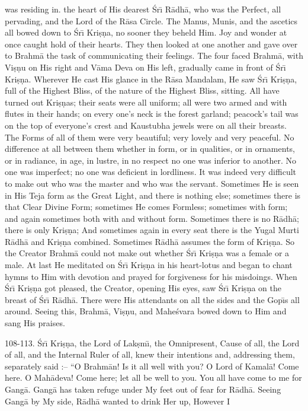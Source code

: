 was residing in. the heart of His dearest \'Sr\={\i} R\=adh\=a, who was the Perfect, all pervading, and the Lord of the R\=asa Circle. The Manus, Munis, and the ascetics all bowed down to \'Sr\={\i} Kri\d{s}\d{n}a, no sooner they beheld Him. Joy and wonder at once caught hold of their hearts. They then looked at one another and gave over to Brahm\=a the task of communicating their feelings. The four faced Brahm\=a, with Vi\d{s}\d{n}u on His right and V\=ama Deva on His left, gradually came in front of \'Sr\={\i} Kri\d{s}\d{n}a. Wherever He cast His glance in the R\=asa Mandalam, He saw \'Sr\={\i} Kri\d{s}\d{n}a, full of the Highest Bliss, of the nature of the Highest Bliss, sitting. All have turned out Kri\d{s}\d{n}as; their seats were all uniform; all were two armed and with flutes in their hands; on every one's neck is the forest garland; peacock's tail was on the top of everyone's crest and Kaustubha jewels were on all their breasts. The Forms of all of them were very beautiful; very lovely and very peaceful. No difference at all between them whether in form, or in qualities, or in ornaments, or in radiance, in age, in lustre, in no respect no one was inferior to another. No one was imperfect; no one was deficient in lordliness. It was indeed very difficult to make out who was the master and who was the servant. Sometimes He is seen in His Teja form as the Great Light, and there is nothing else; sometimes there is that Clear Divine Form; sometimes He comes Formless; sometimes with form; and again sometimes both with and without form. Sometimes there is no R\=adh\=a; there is only Kri\d{s}\d{n}a; And sometimes again in every seat there is the Yugal Murti R\=adh\=a and Kri\d{s}\d{n}a combined. Sometimes R\=adh\=a assumes the form of Kri\d{s}\d{n}a. So the Creator Brahm\=a could not make out whether \'Sr\={\i} Kri\d{s}\d{n}a was a female or a male. At last He meditated on \'Sr\={\i} Kri\d{s}\d{n}a in his heart-lotus and began to chant hymns to Him with devotion and prayed for forgiveness for his misdoings. When \'Sr\={\i} Kri\d{s}\d{n}a got pleased, the Creator, opening His eyes, saw \'Sr\={\i} Kri\d{s}\d{n}a on the breast of \'Sr\={\i} R\=adh\=a. There were His attendants on all the sides and the Gop\={\i}s all around. Seeing this, Brahm\=a, Vi\d{s}\d{n}u, and Mahe\'svara bowed down to Him and sang His praises.

108-113. \'Sr\={\i} Kri\d{s}\d{n}a, the Lord of Lak\d{s}m\={\i}, the Omnipresent, Cause of all, the Lord of all, and the Internal Ruler of all, knew their intentions and, addressing them, separately said :-- ``O Brahm\=an! Is it all well with you? O Lord of Kamal\=a! Come here. O Mah\=adeva! Come here; let all be well to you. You all have come to me for Gang\=a. Gang\=a has taken refuge under My feet out of fear for R\=adh\=a. Seeing Gang\=a by My side, R\=adh\=a wanted to drink Her up, However I

